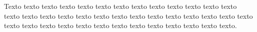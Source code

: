 \label{ap:TITULO}

Texto texto texto texto texto texto texto texto texto texto texto texto texto texto texto texto texto texto texto texto texto texto texto texto texto texto texto texto texto texto texto texto texto texto texto texto texto texto texto texto.